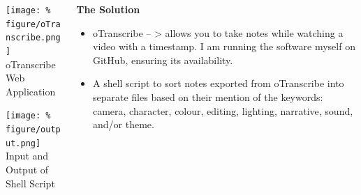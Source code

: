 \documentclass[unknownkeysallowed,usepdftitle=false, parskip=full]{beamer}
\newcommand{\secvariable}{nothing}
\begin{document}
\begin{frame}\label{\secvariable}
  \begin{columns}[t]
  \begin{column}[c]{0.45\textwidth}
  \begin{center}
\texttt{[image: \%
figure/oTranscribe.png]}\\
\tiny{oTranscribe Web Application}

\vspace{12pt}
\texttt{[image: \%
figure/output.png]}\\
\tiny{Input and Output of Shell Script}
\end{center}
    \end{column}
    
    
    \begin{column}[c]{0.45\textwidth}
    \parbox{\linewidth}{
    
        \textbf{The Solution}

\vspace{1pt}

      \begin{itemize}
          \item \small{oTranscribe -- \textgreater{} allows you to take notes while watching a video with a timestamp. I am running the software myself on GitHub, ensuring its availability.}
      \end{itemize}
      \begin{itemize}
          \item \small{A shell script to sort notes exported from oTranscribe into separate files based on their mention of the keywords: camera, character, colour, editing, lighting, narrative, sound, and/or theme.}
      \end{itemize}
      }
    \end{column}
    
  \end{columns}

  
\end{frame}
\end{document}
